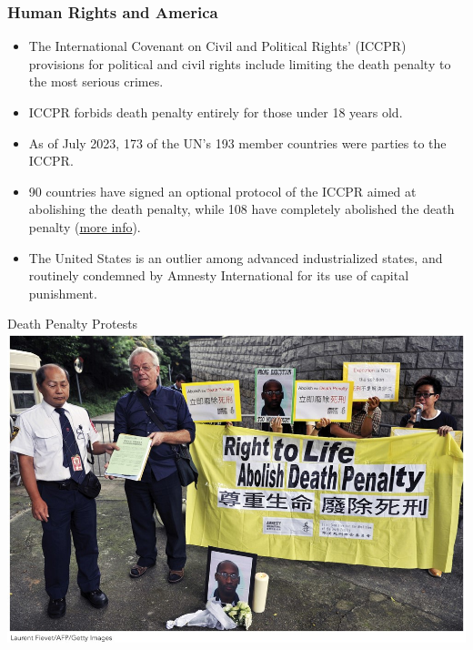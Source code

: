 \documentclass{beamer}
\begin{document}
\begin{frame} 
	\frametitle{\LARGE{Human Rights and America}}
	\begin{itemize}
		\item The International Covenant on Civil and Political Rights’ (ICCPR) provisions for political and civil rights include limiting the death penalty to the most serious crimes. \pause
		\item ICCPR forbids death penalty entirely for those under 18 years old. \pause
		\item As of July 2023, 173 of the UN’s 193 member countries were parties to the ICCPR.
		\item 90 countries have signed an optional protocol of the ICCPR aimed at abolishing the death penalty, while 108 have completely abolished the death penalty (\href{https://www.aljazeera.com/news/2022/10/10/infographic-which-countries-still-have-the-death-penalty-2}{more info}). \pause
		\item The United States is an outlier among advanced industrialized states, and routinely condemned by Amnesty International for its use of capital punishment. 
	\end{itemize}
\end{frame}

\begin{frame}{\LARGE Death Penalty Protests}
	\centering
	\includegraphics[width=\textwidth,height=0.9\textheight,keepaspectratio]{hongkongprotests.jpg}
\end{frame}
\end{document}
